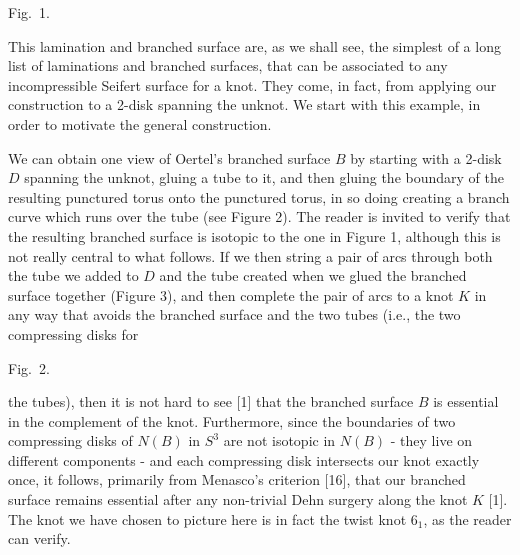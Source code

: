 \smallskip



\vglue 13pt 
\leavevmode
\epsfxsize=3in
\centerline{{}}
\vglue 13pt
\centerline{\eightrm Fig.~1.}

\msk

This lamination and branched surface are, as we shall see, the 
simplest of a long list of laminations and branched surfaces, that 
can be associated to any incompressible Seifert surface for a knot. 
They come, in fact, from applying our construction to a 2-disk 
spanning the unknot. We start with this example, in order to motivate 
the general construction.

We can obtain one view of Oertel's branched surface $B$ by 
starting with a 2-disk $D$ spanning the unknot, gluing a tube to it, and 
then gluing the boundary of the resulting punctured torus onto the 
punctured torus, in so doing
creating a branch curve which runs over the tube (see Figure 2). The 
reader is invited to verify that the resulting branched surface is 
isotopic to the one in Figure 1, although this is not really central to what 
follows. If we then string a pair of arcs through both the tube we 
added to $D$ and the tube created when we glued the branched surface 
together (Figure 3), and then complete the pair of arcs to a knot $K$ 
in any way that avoids the branched surface and the two tubes (i.e., 
the two compressing disks for 

\ssk


\leavevmode
\vglue 13pt 
\epsfxsize=4.5in
\centerline{{}}
\vglue 13pt 
\centerline{\eightrm Fig.~2.}

\msk

\noindent the tubes), then it is not hard to see 
[1] that the branched surface $B$ is essential in the complement of 
the knot. Furthermore, since the boundaries of two compressing disks 
of \delh $N(B)$ in $S^3$ are 
not isotopic in \delh $N(B)$ - they live on different components - 
and each compressing disk intersects our knot exactly once, it follows, 
primarily from Menasco's criterion [16], that our branched surface 
remains essential after any non-trivial Dehn surgery along the knot 
$K$ [1]. The knot we have chosen to picture here is in fact the 
twist knot $6_1$, as the reader can verify.

\smallskip

\leavevmode

\epsfxsize=2.5in
\centerline{{}}

